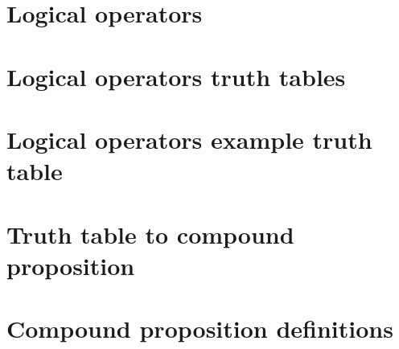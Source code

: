 
\section*{Logical operators}

\vfill
\section*{Logical operators truth tables}

\vfill
\section*{Logical operators example truth table}

\vfill
\section*{Truth table to compound proposition}

\vfill
\section*{Compound proposition definitions}

\vfill
